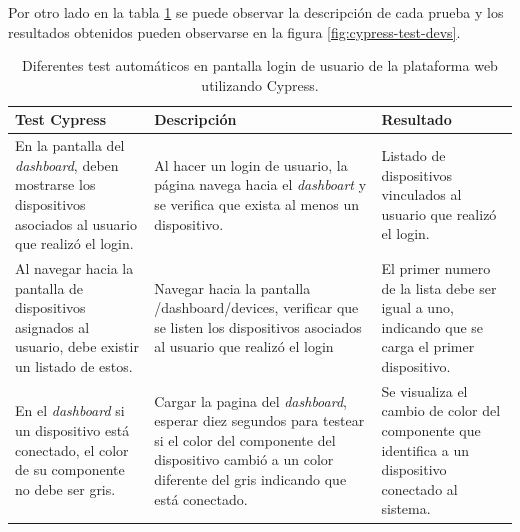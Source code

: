 Por otro lado en la tabla \ref{tab:test-cypress-devs} se puede observar la descripción de cada prueba y los resultados obtenidos pueden observarse en la figura \ref{fig:cypress-test-devs}. 
\pagebreak
\begin{table}[h]
	\centering
	\caption[Test de login utilizando Cypress]{Diferentes test automáticos en pantalla login de usuario de la plataforma web utilizando Cypress.}
	\begin{tabular}{p{4cm} p{4cm} p{4cm}}    
		\toprule
		\textbf{Test Cypress }  		& \textbf{Descripción}	& \textbf{Resultado}\\
		\midrule
	
		En la pantalla del \textit{dashboard}, deben mostrarse los dispositivos asociados al usuario que realizó el login.			& Al hacer un login de usuario, la página navega hacia el \textit{dashboart} y se verifica que exista al menos un dispositivo.				& Listado de dispositivos vinculados al usuario que realizó el login.\\	
		
		Al navegar hacia la pantalla de dispositivos asignados al usuario, debe existir un listado de estos. 	 			& Navegar hacia la pantalla /dashboard/devices, verificar que se listen los dispositivos asociados al usuario que realizó el login 				& El primer numero de la lista debe ser igual a uno, indicando que se carga el primer dispositivo.\\	
		
		En el \textit{dashboard} si un dispositivo está conectado, el color de su componente no debe ser gris.   & Cargar la pagina del \textit{dashboard}, esperar diez segundos para testear si el color del componente del dispositivo cambió a un color diferente del gris indicando que está conectado.		& Se visualiza el cambio de color del componente que identifica a un dispositivo conectado al sistema. \\
		
		
		\bottomrule
		\hline
	\end{tabular}
\label{tab:test-cypress-devs}
\end{table}




